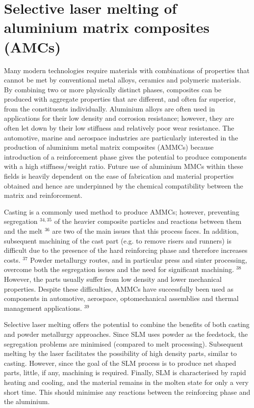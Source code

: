 \documentclass[10pt]{article}
\begin{document}
\section*{Selective laser melting of aluminium matrix composites (AMCs)}
Many modern technologies require materials with combinations of properties that cannot be met by conventional metal alloys, ceramics and polymeric materials. By combining two or more physically distinct phases, composites can be produced with aggregate properties that are different, and often far superior, from the constituents individually. Aluminium alloys are often used in applications for their low density and corrosion resistance; however, they are often let down by their low stiffness and relatively poor wear resistance. The automotive, marine and aerospace industries are particularly interested in the production of aluminium metal matrix composites (AMMCs) because introduction of a reinforcement phase gives the potential to produce components with a high stiffness/weight ratio. Future use of aluminium MMCs within these fields is heavily dependent on the ease of fabrication and material properties obtained and hence are underpinned by the chemical compatibility between the matrix and reinforcement.

Casting is a commonly used method to produce AMMCs; however, preventing segregation ${ }^{34,35}$ of the heavier composite particles and reactions between them and the melt ${ }^{36}$ are two of the main issues that this process faces. In addition, subsequent machining of the cast part (e.g. to remove risers and runners) is difficult due to the presence of the hard reinforcing phase and therefore increases costs. ${ }^{37}$ Powder metallurgy routes, and in particular press and sinter processing, overcome both the segregation issues and the need for significant machining. ${ }^{38}$ However, the parts usually suffer from low density and lower mechanical properties. Despite these difficulties, AMMCs have successfully been used as components in automotive, aerospace, optomechanical assemblies and thermal management applications. ${ }^{39}$

Selective laser melting offers the potential to combine the benefits of both casting and powder metallurgy approaches. Since SLM uses powder as the feedstock, the segregation problems are minimised (compared to melt processing). Subsequent melting by the laser facilitates the possibility of high density parts, similar to casting. However, since the goal of the SLM process is to produce net shaped parts, little, if any, machining is required. Finally, SLM is characterised by rapid heating and cooling, and the material remains in the molten state for only a very short time. This should minimise any reactions between the reinforcing phase and the aluminium.
\end{document}
